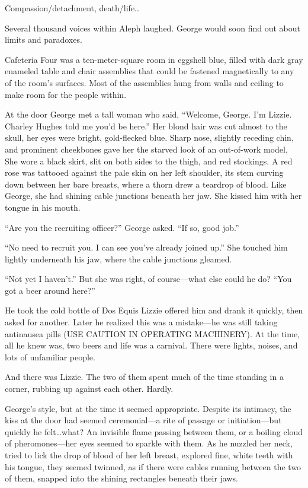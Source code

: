 Compassion/detachment, death/life\ldots

Several thousand voices within Aleph laughed. George would soon find out about limits and paradoxes.

Cafeteria Four was a ten-meter-square room in eggshell blue, filled with dark gray enameled table and chair assemblies that could be fastened magnetically to any of the room's surfaces. Most of the assemblies hung from walls and ceiling to make room for the people within.

At the door George met a tall woman who said, ``Welcome, George. I'm Lizzie. Charley Hughes told me you'd be here.'' Her blond hair was cut almost to the skull, her eyes were bright, gold-flecked blue. Sharp nose, slightly receding chin, and prominent cheekbones gave her the starved look of an out-of-work model, She wore a black skirt, slit on both sides to the thigh, and red stockings. A red rose was tattooed against the pale skin on her left shoulder, its stem curving down between her bare breasts, where a thorn drew a teardrop of blood. Like George, she had shining cable junctions beneath her jaw. She kissed him with her tongue in his mouth.

``Are you the recruiting officer?'' George asked. ``If so, good job.''

``No need to recruit you. I can see you've already joined up.'' She touched him lightly underneath his jaw, where the cable junctions gleamed.

``Not yet I haven't.'' But she was right, of course—what else could he do? ``You got a beer around here?''

He took the cold bottle of Dos Equis Lizzie offered him and drank it quickly, then asked for another. Later he realized this was a mistake—he was still taking antinausea pills (USE CAUTION IN OPERATING MACHINERY). At the time, all he knew was, two beers and life was a carnival. There were lights, noises, and lots of unfamiliar people.

And there was Lizzie. The two of them spent much of the time standing in a corner, rubbing up against each other. Hardly.

George's style, but at the time it seemed appropriate. Despite its intimacy, the kiss at the door had seemed ceremonial—a rite of passage or initiation—but quickly he felt\ldots what? An invisible flame passing between them, or a boiling cloud of pheromones—her eyes seemed to sparkle with them. As he nuzzled her neck, tried to lick the drop of blood of her left breast, explored fine, white teeth with his tongue, they seemed twinned, as if there were cables running between the two of them, snapped into the shining rectangles beneath their jaws.

